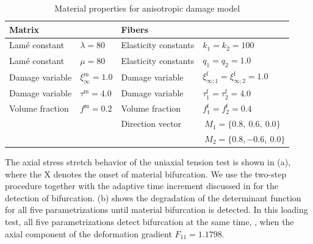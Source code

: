 \documentclass[12pt]{article}
\newcommand{\mtrx}{{\text{m}}}
\newcommand{\fiber}{{\text{f}}}
\numberwithin{equation}{section}
\begin{document}
\begin{table}[!htbp]
  \begin{center}
    \begin{tabular}{ l l l l }
      \toprule
      Matrix
      &

      &

      Fibers

      &
      \\
      \midrule
      Lam\'{e} constant
      &
      $\lambda=80$
      &
      Elasticity constants
      &
      $k_1 = k_2 = 100$
      \\
      Lam\'{e} constant
      &
      $\mu = 80$
      &
      Elasticity constants
      &
      $q_1 = q_2 = 1.0$
      \\
      Damage variable
      &
      $\xi^\mtrx_\infty = 1.0$
      &
      Damage variable
      &
      $\xi^\fiber_{\infty;1} = \xi^\fiber_{\infty;2} = 1.0$
      \\
      Damage variable
      &
      $\tau^\mtrx = 4.0$
      &
      Damage variable
      &
      $\tau^\fiber_1 = \tau^\fiber_2 = 4.0$
      \\
      Volume fraction
      &
      $f^\mtrx = 0.2$
      &
      Volume fraction
      &
      $f^\fiber_1 = f^\fiber_2 = 0.4$
      \\
      &

      &
      Direction vector
      &
      $~M_1 = \{ 0.8,~0.6,~0.0\}$
      \\
      &

      &

      &
      $~M_2 = \{ 0.8,-0.6,~0.0\}$
      \\
      \bottomrule
    \end{tabular}
    \caption{Material properties for anisotropic damage model}
    \label{tab:aniso-material}
  \end{center}
\end{table}

The axial stress \vs stretch behavior of the uniaxial tension test is
shown in (a), where the X denotes the
onset of material bifurcation. We use the two-step procedure together
with the adaptive time increment discussed in  for
the detection of bifurcation. (b) shows
the degradation of the determinant function for all five
parametrizations until material bifurcation is detected. In this
loading test, all five parametrizations detect bifurcation at the same
time, \ie, when the axial component of the deformation gradient
$F_{11} = 1.1798$.
\end{document}

